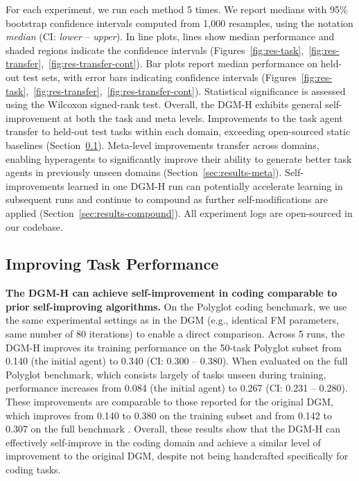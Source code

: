 For each experiment, we run each method 5 times. We report medians with 95\% bootstrap confidence intervals computed from 1,000 resamples, using the notation \textit{median} (CI: \textit{lower} -- \textit{upper}). In line plots, lines show median performance and shaded regions indicate the confidence intervals (Figures~\ref{fig:res-task},~\ref{fig:res-transfer},~\ref{fig:res-transfer-cont}). Bar plots report median performance on held-out test sets, with error bars indicating confidence intervals (Figures~\ref{fig:res-task},~\ref{fig:res-transfer},~\ref{fig:res-transfer-cont}). Statistical significance is assessed using the Wilcoxon signed-rank test. Overall, the DGM-H exhibits general self-improvement at both the task and meta levels. Improvements to the task agent transfer to held-out test tasks within each domain, exceeding open-sourced static baselines (Section~\ref{sec:results-task}). Meta-level improvements transfer across domains, enabling hyperagents to significantly improve their ability to generate better task agents in previously unseen domains (Section~\ref{sec:results-meta}). Self-improvements learned in one DGM-H run can potentially accelerate learning in subsequent runs and continue to compound as further self-modifications are applied (Section~\ref{sec:results-compound}). All experiment logs are open-sourced in our codebase.

\subsection{Improving Task Performance}
\label{sec:results-task}

\textbf{The DGM-H can achieve self-improvement in coding comparable to prior self-improving algorithms.} On the Polyglot coding benchmark, we use the same experimental settings as in the DGM (e.g., identical FM parameters, same number of 80 iterations) to enable a direct comparison. Across 5 runs, the DGM-H improves its training performance on the 50-task Polyglot subset from 0.140 (the initial agent) to 0.340 (CI: 0.300 -- 0.380). When evaluated on the full Polyglot benchmark, which consists largely of tasks unseen during training, performance increases from 0.084 (the initial agent) to 0.267 (CI: 0.231 -- 0.280). These improvements are comparable to those reported for the original DGM, which improves from 0.140 to 0.380 on the training subset and from 0.142 to 0.307 on the full benchmark \citep{zhang2025darwin}. Overall, these results show that the DGM-H can effectively self-improve in the coding domain and achieve a similar level of improvement to the original DGM, despite not being handcrafted specifically for coding tasks.

